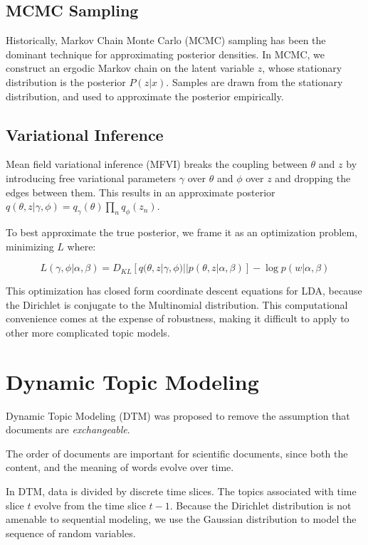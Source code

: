 \documentclass[letterpaper]{article}
\begin{document}
\subsection{MCMC Sampling}
\label{subsec:mcmc-sampling}
Historically, Markov Chain Monte Carlo (MCMC) sampling has been the
dominant technique for approximating posterior densities. In MCMC, we
construct an ergodic Markov chain on the latent variable $z$,
whose stationary distribution is the posterior $P( z | x)$.
Samples are drawn from the stationary distribution, and used to
approximate the posterior empirically.

\subsection{Variational Inference}
\label{subsec:vi}
Mean field variational inference (MFVI) breaks the coupling between
$\theta$ and $z$ by introducing free variational parameters $\gamma$
over $\theta$ and $\phi$ over $z$ and dropping the edges between them.
This results in an approximate posterior $q(\theta, z | \gamma, \phi)
= q_\gamma(\theta)\prod_nq_\phi(z_n)$.

To best approximate the true posterior, we frame it as an optimization
problem, minimizing $L$ where:

\begin{equation}
L(\gamma, \phi | \alpha, \beta) = D_{KL}\left[ q(\theta, z | \gamma,
  \phi) || p(\theta, z | \alpha, \beta) \right] - \log p(w | \alpha, \beta)
\end{equation}

This optimization has closed form coordinate descent equations for
LDA, because the Dirichlet is conjugate to the Multinomial
distribution. This computational convenience comes at the expense of
robustness, making it difficult to apply to other more complicated
topic models.

\section{Dynamic Topic Modeling}
\label{sec:dtm}
Dynamic Topic Modeling (DTM) was proposed to remove the assumption
that documents are \textit{exchangeable}. \citep{blei2006dynamic}

The order of documents are important for scientific documents, since
both the content, and the meaning of words evolve over time.

In DTM, data is divided by discrete time slices. The topics associated
with time slice $t$ evolve from the time slice $t-1$. Because the
Dirichlet distribution is not amenable to sequential modeling, we use
the Gaussian distribution to model the sequence of random variables.
\end{document}

